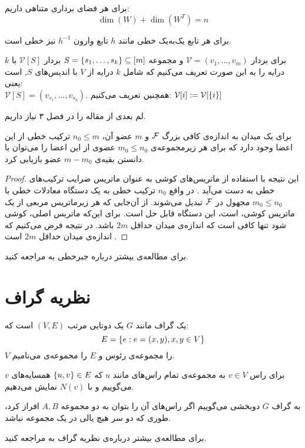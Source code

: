 \begin{theorem}
	برای هر فضای برداری متناهی داریم:
	$$\dim(W) + \dim(W^T) = n$$
\end{theorem}
\begin{remark}
	برای هر تابع یک‌به‌یک خطی مانند
	$h$
	تابع وارون 
	$h^{-1}$
	نیز خطی است.
\end{remark}
\begin{notation}
برای بردار
$\mathcal{V} = (v_1, \ldots, v_m)$ 
و مجموعه
$S = \left\{ s_1, \ldots, s_k \right\} \subseteq [m]$
بردار
$\mathcal{V} [S]$ 
با 
$k$ درایه 
را به این صورت تعریف می‌کنیم که شامل
$k$ 
درایه از
$V$ 
با اندیس‌های
$S$, 
است یعنی:\\
$\mathcal{V} [S] = (v_{s_1}, \ldots, v_{s_k})$.
همچنین تعریف می‌کنیم:
$\mathcal{V} [i] := \mathcal{V} [{\left\{ i \right\}}]$
\end{notation}

لم بعدی از مقاله
\cite{pliable2015paper}
را در فصل ۳ نیاز داریم.
\begin{lemma}
	\label{lemma:pliable20151}
	برای یک میدان به اندازه‌ی کافی بزرگ
	$\mathcal{F}$
	و
	$m$
	عضو آن،
	$n_0 \leq m$
	ترکیب خطی از این اعضا وجود دارد که برای هر زیرمجموعه‌ی
	$m_0 \leq n_0$
	عضوی از این اعضا را می‌توان با دانستن بقیه‌ی
	$m - m_0$
	عضو بازیابی کرد.
\end{lemma}
\begin{proof}
این نتیجه با استفاده از ماتریس‌های کوشی به عنوان ماتریس ضرایب ترکیب‌های خطی به دست می‌آید
\cite{Blmer1995AnXE}.
در واقع
$n_0$
ترکیب خطی به یک دستگاه معادلات خطی با
$m_0 \leq n_0$
مجهول در
$\mathcal{F}$
تبدیل می‌شوند. از آن‌جایی که هر زیرماتریس مربعی از یک ماتریس کوشی، 
است، این دستگاه قابل حل است. برای این‌که ماتریس اصلی، کوشی شود تنها کافی است که اندازه‌ی میدان حداقل
$2m$
باشد. در نتیجه فرض می‌کنیم که اندازه‌ی میدان حداقل
$2m$
است
\cite{pliable2015paper}.
\end{proof}
	برای مطالعه‌ی بیشتر درباره جبرخطی به
\cite{sheldon}
مراجعه کنید.
\section{نظریه گراف}
\begin{definition}[گراف]
یک گراف مانند
$G$
یک دوتایی مرتب
$(V, E)$
است که:
$$E = \left\{ e: e = (x, y), x, y \in V \right\}$$
 $V$
را مجموعه‌ی رئوس و
$E$
را مجموعه‌ی 
می‌نامیم.
\end{definition}
\begin{definition}[همسایه]
برای راس
$v\in V$
به مجمو‌عه‌ی تمام راس‌های مانند
  $u$ 
  که
  $\left\{ u,v \right\}\in E$
  همسایه‌های 
  $v$
  می‌گوییم و با
  $N(v)$
  نمایش می‌دهیم.
  \end{definition}
  \begin{definition}
  
به گراف
$G$
دوبخشی می‌گوییم اگر راس‌های آن را بتوان به دو مجموعه 
$A, B$
افراز کرد، طوری که دو سر هیچ یالی در یک مجموعه نباشد.
\end{definition}
	برای مطالعه‌ی بیشتر درباره‌ی نظریه گراف به
\cite{west}
مراجعه کنید.

